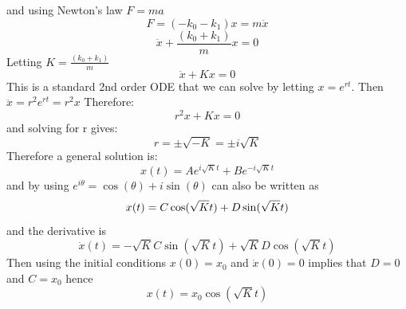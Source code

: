 and using Newton's law $F = ma$
\[F = (-k_{0} - k_{1})x = m\ddot{x}	\]
\[\ddot{x} + \frac{(k_{0} + k_{1})}{m}x = 0\]
Letting $K = \frac{(k_{0} + k_{1})}{m}$
\begin{equation}
	\label{eqn_motion}
	\ddot{x} + Kx = 0
\end{equation}
This is a standard 2nd order ODE that we can solve by letting $x = e^{rt}$.
Then $\ddot{x} = r^{2}e^{rt} = r^{2}x$ Therefore:
\[
	r^{2}x + Kx = 0
\]
and solving for r gives:
\[r = \pm\sqrt{-K} = \pm i \sqrt{K}\]
Therefore a general solution is:
\[
	x(t) = Ae^{i\sqrt{K}t} + Be^{-i\sqrt{K}t}	
\]
and by using $e^{i\theta} = \cos(\theta) + i\sin(\theta)$ can also be written as
\[
	x(t) = C\cos(\sqrt{K}t) + D\sin(\sqrt{K}t)\\	
\]
and the derivative is
\[
	\dot{x}(t) = -\sqrt{K}C\sin(\sqrt{K}t) + \sqrt{K}D\cos(\sqrt{K}t)
\]
Then using the initial conditions $x(0)=x_0$ and $\dot{x}(0) = 0$ implies that
$D=0$ and $C=x_0$ hence
\begin{equation}
	x(t) = x_0\cos(\sqrt{K}t)
\end{equation}

